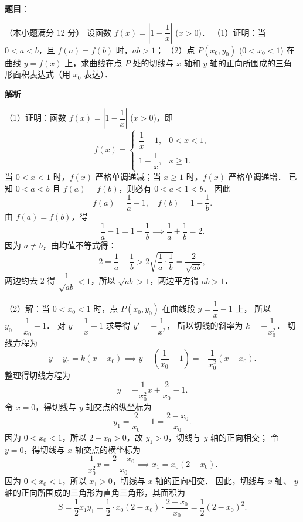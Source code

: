 \begin{answer}

\end{answer}
\begin{answer}

\textbf{题目}：

（本小题满分 12 分）
设函数 $f(x) = \left| 1 - \dfrac{1}{x} \right|$ ($x > 0$)．
（1）证明：当 $0 < a < b$，且 $f(a) = f(b)$ 时，$ab > 1$；
（2）点 $P(x_0, y_0)$ ($0 < x_0 < 1$) 在曲线 $y = f(x)$ 上，求曲线在点 $P$ 处的切线与 $x$ 轴和 $y$ 轴的正向所围成的三角形面积表达式（用 $x_0$ 表达）．

\textbf{解析}

（1）证明：函数 $f(x) = \left| 1 - \dfrac{1}{x} \right|$ ($x > 0$)，即
\nopagebreak[4]
\[
f(x) = \begin{cases}
\dfrac{1}{x} - 1, & 0 < x < 1, \\
1 - \dfrac{1}{x}, & x \geqslant 1.
\end{cases}
\]
当 $0 < x < 1$ 时，$f(x)$ 严格单调递减；当 $x \geqslant 1$ 时，$f(x)$ 严格单调递增．
已知 $0 < a < b$ 且 $f(a) = f(b)$，则必有 $0 < a < 1 < b$．
因此
\nopagebreak[4]
\[
f(a) = \dfrac{1}{a} - 1, \quad f(b) = 1 - \dfrac{1}{b}.
\]
由 $f(a) = f(b)$，得
\nopagebreak[4]
\[
\dfrac{1}{a} - 1 = 1 - \dfrac{1}{b} \implies \dfrac{1}{a} + \dfrac{1}{b} = 2.
\]
因为 $a \neq b$，由均值不等式得：
\nopagebreak[4]
\[
2 = \dfrac{1}{a} + \dfrac{1}{b} > 2\sqrt{\dfrac{1}{a} \cdot \dfrac{1}{b}} = \dfrac{2}{\sqrt{ab}},
\]
两边约去 2 得 $\dfrac{1}{\sqrt{ab}} < 1$，所以 $\sqrt{ab} > 1$，两边平方得 $ab > 1$．

（2）解：当 $0 < x_0 < 1$ 时，点 $P(x_0, y_0)$ 在曲线段 $y = \dfrac{1}{x} - 1$ 上，
所以 $y_0 = \dfrac{1}{x_0} - 1$．
对 $y = \dfrac{1}{x} - 1$ 求导得 $y' = -\dfrac{1}{x^2}$，
所以切线的斜率为 $k = -\dfrac{1}{x_0^2}$．
切线方程为
\nopagebreak[4]
\[
y - y_0 = k(x - x_0) \implies y - \left(\dfrac{1}{x_0} - 1\right) = -\dfrac{1}{x_0^2}(x - x_0).
\]
整理得切线方程为
\nopagebreak[4]
\[
y = -\dfrac{1}{x_0^2}x + \dfrac{2}{x_0} - 1.
\]
令 $x = 0$，得切线与 $y$ 轴交点的纵坐标为
\nopagebreak[4]
\[
y_1 = \dfrac{2}{x_0} - 1 = \dfrac{2 - x_0}{x_0}.
\]
因为 $0 < x_0 < 1$，所以 $2 - x_0 > 0$，故 $y_1 > 0$，切线与 $y$ 轴的正向相交；
令 $y = 0$，得切线与 $x$ 轴交点的横坐标为
\nopagebreak[4]
\[
\dfrac{1}{x_0^2}x = \dfrac{2 - x_0}{x_0} \implies x_1 = x_0(2 - x_0).
\]
因为 $0 < x_0 < 1$，所以 $x_1 > 0$，切线与 $x$ 轴的正向相交．
因此，切线与 $x$ 轴、 $y$ 轴的正向所围成的三角形为直角三角形，其面积为
\nopagebreak[4]
\[
S = \dfrac{1}{2} x_1 y_1 = \dfrac{1}{2} \cdot x_0(2 - x_0) \cdot \dfrac{2 - x_0}{x_0} = \dfrac{1}{2}(2 - x_0)^2.
\]


\end{answer}
